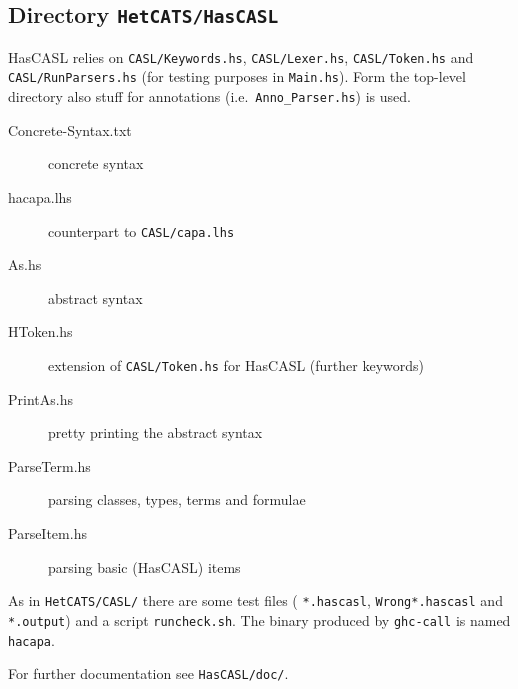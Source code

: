 \documentclass{article}
\begin{document}
\subsection{Directory \texttt{HetCATS/HasCASL}}

HasCASL relies on \texttt{CASL/Keywords.hs}, \texttt{CASL/Lexer.hs},
\texttt{CASL/Token.hs} and \texttt{CASL/RunParsers.hs} (for testing
purposes in \texttt{Main.hs}). Form the top-level directory also stuff
for annotations (i.e.\ \texttt{Anno\_Parser.hs}) is used.

\begin{description}
\item[Concrete-Syntax.txt] concrete syntax
\item[hacapa.lhs] counterpart to \texttt{CASL/capa.lhs} 
\item[As.hs] abstract syntax
\item[HToken.hs] extension of \texttt{CASL/Token.hs} for HasCASL
  (further keywords)
\item[PrintAs.hs] pretty printing the abstract syntax
\item[ParseTerm.hs] parsing classes, types, terms and formulae
\item[ParseItem.hs] parsing basic (HasCASL) items
\end{description}

As in \texttt{HetCATS/CASL/} there are some test files (
\texttt{*.hascasl}, \texttt{Wrong*.hascasl} and \texttt{*.output}) and a
script \texttt{runcheck.sh}. The binary produced by \texttt{ghc-call}
is named \texttt{hacapa}.

For further documentation see \texttt{HasCASL/doc/}. 
\end{document}
